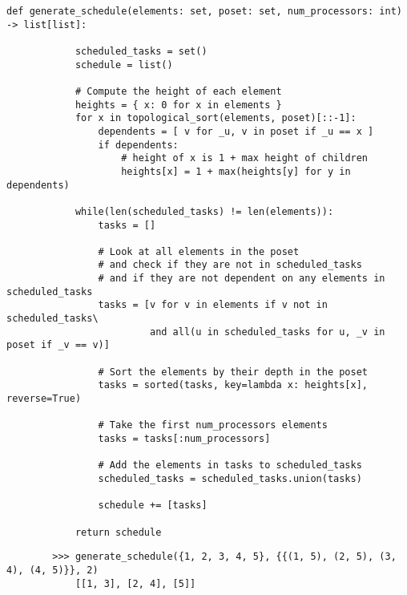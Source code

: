 \documentclass{article}
\begin{document}
    \begin{tcolorbox}[enhanced,title=Correct Approach,
        colframe=green!50!black,colback=green!10!white,
        arc=1mm,colbacktitle=green!10!white,
        fonttitle=\bfseries,coltitle=green!50!black,
        attach boxed title to top center=
        {yshift=-2mm,yshifttext=-1mm},
        boxed title style={
        interior style={fill=none,
        top color=green!30!white,
        bottom color=green!20!white}}]
        \begin{lstlisting}[belowskip=-10pt]
        def generate_schedule(elements: set, poset: set, num_processors: int) -> list[list]:
        
            scheduled_tasks = set()
            schedule = list()

            # Compute the height of each element
            heights = { x: 0 for x in elements }
            for x in topological_sort(elements, poset)[::-1]:
                dependents = [ v for _u, v in poset if _u == x ]
                if dependents:
                    # height of x is 1 + max height of children
                    heights[x] = 1 + max(heights[y] for y in dependents)
         
            while(len(scheduled_tasks) != len(elements)):
                tasks = []
                
                # Look at all elements in the poset
                # and check if they are not in scheduled_tasks
                # and if they are not dependent on any elements in scheduled_tasks
                tasks = [v for v in elements if v not in scheduled_tasks\
                         and all(u in scheduled_tasks for u, _v in poset if _v == v)]

                # Sort the elements by their depth in the poset
                tasks = sorted(tasks, key=lambda x: heights[x], reverse=True)
        
                # Take the first num_processors elements
                tasks = tasks[:num_processors]
        
                # Add the elements in tasks to scheduled_tasks
                scheduled_tasks = scheduled_tasks.union(tasks)
        
                schedule += [tasks]
            
            return schedule
        \end{lstlisting}
\end{tcolorbox}

\begin{lstlisting}
        >>> generate_schedule({1, 2, 3, 4, 5}, {{(1, 5), (2, 5), (3, 4), (4, 5)}}, 2)
            [[1, 3], [2, 4], [5]]
\end{lstlisting}
\end{document}
